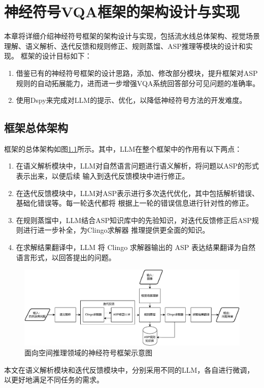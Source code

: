 \chapter{神经符号VQA框架的架构设计与实现}
本章将详细介绍神经符号框架的架构设计与实现，包括流水线总体架构、视觉场景理解、语义解析、迭代反馈和规则修正、规则蒸馏、ASP推理等模块的设计和实现。
框架的设计目标如下：
\begin{enumerate}[label=(\arabic*),itemsep=0pt,parsep=0pt]
\item 借鉴已有的神经符号框架的设计思路，添加、修改部分模块，提升框架对ASP规则的自动拓展能力，进而进一步增强VQA系统回答部分可见问题的准确率。
\item 使用Dspy来完成对LLM的提示、优化，以降低神经符号方法的开发难度。
\end{enumerate}
\section{框架总体架构}
框架的总体架构如图\ref{fig:pipeline}所示。其中，LLM在整个框架中的作用有以下两点：
\begin{enumerate}[label=(\arabic*),itemsep=0pt,parsep=0pt]
    \item 在语义解析模块中，LLM对自然语言问题进行语义解析，将问题以ASP的形式表示出来，以便后续
输入到迭代反馈模块中进行修正。
    \item 在迭代反馈模块中，LLM对ASP表示进行多次迭代优化，其中包括解析错误、基础化错误等。每一轮迭代都将
根据上一轮的错误信息进行针对性的修正。
    \item 在规则蒸馏中，LLM结合ASP知识库中的先验知识，对迭代反馈修正后ASP规则进行进一步补全，为Clingo求解器
推理提供更全面的知识。
    \item 在求解结果翻译中，LLM 将 Clingo 求解器输出的 ASP 表达结果翻译为自然语言形式，以回答提出的问题。
\end{enumerate}
\begin{figure}
    \centering
    \includegraphics[width=\textwidth]{figures/pipeline-crop.pdf}
    \caption{面向空间推理领域的神经符号框架示意图}
    \label{fig:pipeline}
\end{figure}
本文在语义解析模块和迭代反馈模块中，分别采用不同的LLM，各自进行微调，以更好地满足不同任务的需求。
